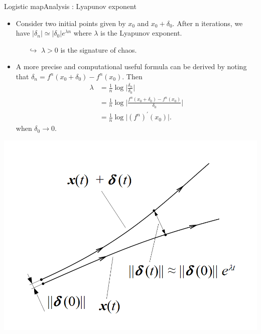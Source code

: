 \documentclass[usenames,dvipsnames,svgnames,10pt,aspectratio=169]{beamer}
\begin{document}
\begin{frame}[t, c]{Logistic map}{Analysis : Lyapunov exponent}
	\begin{minipage}{.58\textwidth}
		\begin{itemize}
			\item Consider two initial points given by \( x_0 \) and \( x_0 + \delta_0 \).
			After n iterations, we have \( \vert \delta_n \vert \simeq \vert \delta_0 \vert e^{\lambda n} \) where \( \lambda \) is the Lyapunov exponent.
			\begin{itemize}
				\item[\( \hookrightarrow \)] \( \lambda > 0 \) is the signature of chaos.
			\end{itemize}

			\item A more precise and computational useful formula can be derived by noting that \( \delta_n = f^n(x_0 + \delta_0)  - f^n(x_0) \). Then
			\[
				\begin{aligned}
					\lambda & = \frac{1}{n} \log \Big\vert \frac{\delta_n}{\delta_0} \Big\vert \\
					& = \frac{1}{n} \log \Big\vert \frac{f^n(x_0 + \delta_0) - f^n(x_0)}{\delta_0} \Big\vert \\
					& = \frac{1}{n} \log \vert \left(f^n\right)^{\prime}(x_0) \vert.
				\end{aligned}
			\]
			when \( \delta_0 \to 0 \).
		\end{itemize}
	\end{minipage}%
	\hfill
	\begin{minipage}{.38\textwidth}
		\includegraphics[width=\textwidth]{lyapunov}
	\end{minipage}

	\vspace{1cm}
\end{frame}
\end{document}
